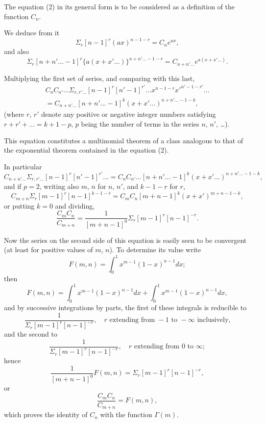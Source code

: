 \documentclass[11pt,a4paper]{book}
\begin{document}
The equation (2) in its general form is to be considered as a definition of the function $C_n$.

We deduce from it
\[\Sigma_r [n-1]^r (ax)^{n-1-r} = C_n e^{ax},\]
and also
\[\Sigma_r [n+n'\ldots-1]^r \{a(x+x'\ldots)\}^{n+n'\ldots-1-r} = C_{n+n'\ldots} e^{a(x+x'\ldots)}.\]

Multiplying the first set of series, and comparing with this last,
\begin{multline}
C_n C_{n'}\ldots \Sigma_{r,r'\ldots} [n-1]^r [n'-1]^{r'}\ldots x^{n-1-r} x'^{n'-1-r'}\ldots \\ = C_{n+n'\ldots} [n+n'\ldots-1]^k (x+x'\ldots)^{n+n'\ldots-1-k},\tag{3}\end{multline}
(where $r$, $r'$ denote any positive or negative integer numbers satisfying $r + r' + \ldots = k + 1 - p$, $p$ being the number of terms in the series $n$, $n'$, \ldots).

This equation constitutes a multinomial theorem of a class analogous to that of the exponential theorem contained in the equation (2).

In particular
\begin{equation}C_{n+n'\ldots} \Sigma_{r,r'\ldots} [n-1]^r [n'-1]^{r'}\ldots = C_n C_{n'}\ldots [n+n'\ldots-1]^k (x+x'\ldots)^{n+n'\ldots-1-k},\tag{4}\end{equation}
and if $p=2$, writing also $m$, $n$ for $n$, $n'$, and $k-1-r$ for $r$,
\begin{equation}C_{m+n} \Sigma_r [m-1]^r [n-1]^{k-1-r} = C_m C_n [m+n-1]^k (x+x')^{m+n-1-k},\tag{5}\end{equation}
or putting $k=0$ and dividing,
\begin{equation}\frac{C_m C_n}{C_{m+n}} = \frac{1}{[m+n-1]^0} \Sigma_r [m-1]^r [n-1]^{-r}.\tag{6}\end{equation}

Now the series on the second side of this equation is easily seen to be convergent (at least for positive values of $m$, $n$). To determine its value write
\[F(m,n) = \int_0^1 x^{m-1} (1-x)^{n-1} dx;\]
then
\[F(m,n) = \int_0^1 x^{m-1} (1-x)^{n-1} dx + \int_0^1 x^{m-1} (1-x)^{n-1} dx,\]
and by successive integrations by parts, the first of these integrals is reducible to
\[\frac{1}{\Sigma_r [m-1]^r [n-1]^{-r}}, \quad r \text{ extending from } -1 \text{ to } -\infty \text{ inclusively,}\]
and the second to
\[\frac{1}{\Sigma_r [m-1]^r [n-1]^{-r}}, \quad r \text{ extending from } 0 \text{ to } \infty;\]
hence
\[\frac{1}{[m+n-1]^0} F(m,n) = \Sigma_r [m-1]^r [n-1]^{-r},\]
or
\begin{equation}\frac{C_m C_n}{C_{m+n}} = F(m,n),\tag{7}\end{equation}
which proves the identity of $C_n$ with the function $\Gamma(m)$.
\end{document}
